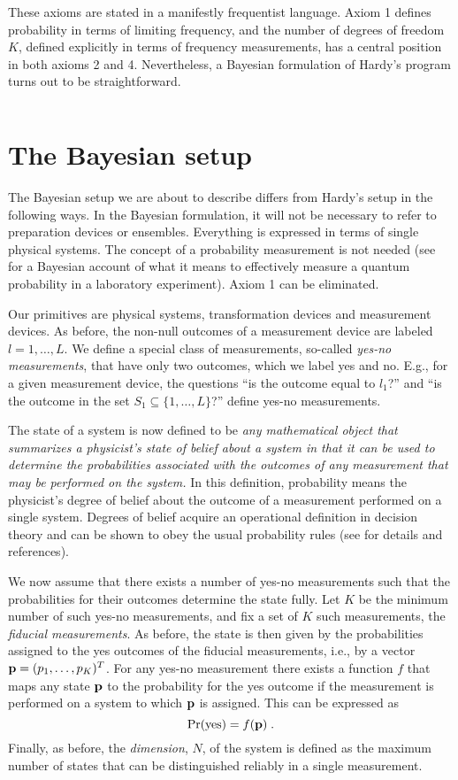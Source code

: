 \documentclass[pra,12pt,tightenlines]{revtex4-2}
\def\p{{\bf p}}
\begin{document}
These axioms are stated in a manifestly frequentist language. Axiom 1 defines
probability in terms of limiting frequency, and the number of degrees of
freedom $K$, 
defined explicitly in terms of frequency measurements, has a central
position in both axioms 2 and 4. Nevertheless, a Bayesian formulation of
Hardy's program turns out to be straightforward.

$\;$ \section{The Bayesian setup}  \label{sec:Bayesian}

The Bayesian setup we are about to describe differs from Hardy's setup in the
following ways. In the Bayesian formulation, it will not be necessary to refer
to preparation devices or ensembles. Everything is expressed in terms of
single physical systems. The concept of a probability measurement is not
needed (see \cite{Caves2002b} for a Bayesian account
of what it means to effectively measure a quantum probability in a laboratory
experiment). Axiom 1 can be eliminated. 

Our primitives are physical systems, transformation devices and measurement
devices. As before, the non-null outcomes of a measurement device are labeled
$l=1,\ldots,L$. We define a special class of  measurements, so-called {\it
  yes-no measurements}, that have only two outcomes, which we label yes and
no.  E.g., for a given measurement device, the questions
``is the outcome equal to $l_1$?'' and ``is the outcome in the set
$S_1\subseteq\{1,\ldots,L\}$?'' define yes-no measurements. 

The state of a system is now defined to be {\it any mathematical object that
  summarizes a physicist's state of belief about a system in that it can be
  used to determine the probabilities associated with the outcomes of any
  measurement that may be performed on the system.} In this definition,
probability means the physicist's degree of belief about the outcome of a
measurement performed on a single system. Degrees of belief acquire an
operational definition in decision theory and can be shown to obey the usual
probability rules (see \cite{Caves2002a} for details and references).

We now assume that there exists a number of yes-no measurements such that the
probabilities for their outcomes determine the state fully. Let $K$ be the
minimum number of such yes-no measurements, and fix a set of $K$ such
measurements, the {\it fiducial measurements}. As before, the state is then
given by the probabilities assigned to the yes outcomes of the fiducial
measurements, i.e., by a vector $\p=(p_1,\ldots,p_K)^T$. For any yes-no
measurement there exists a function $f$ that maps any state $\p$ to the
probability for the yes outcome if the measurement is performed on a system
to which $\p$ is assigned. This can be expressed as
\begin{equation}
\Pr({\rm yes})=f(\p) \;.
\end{equation}
Finally, as before, the {\it dimension}, $N$, of the system is defined as the
maximum number of states that can be distinguished reliably in a single
measurement. 
\end{document}
